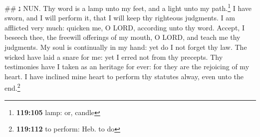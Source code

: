 \#\# נ NUN.  Thy word is a lamp unto my feet, and a
light unto my path.\footnote{\textbf{119:105} lamp: or, candle}
 I have sworn, and I will perform it, that I will keep
thy righteous judgments.  I am afflicted very much:
quicken me, O LORD, according unto thy word.  Accept, I
beseech thee, the freewill offerings of my mouth, O LORD, and teach me
thy judgments.  My soul is continually in my hand: yet
do I not forget thy law.  The wicked have laid a snare
for me: yet I erred not from thy precepts.  Thy
testimonies have I taken as an heritage for ever: for they are the
rejoicing of my heart.  I have inclined mine heart to
perform thy statutes alway, even unto the end.\footnote{\textbf{119:112}
  to perform: Heb. to do}

